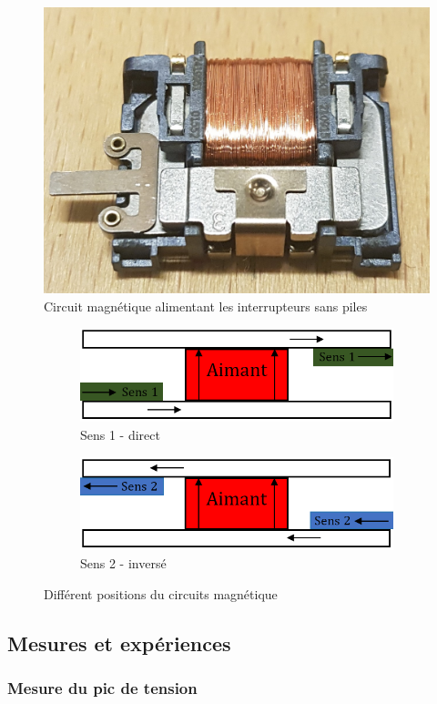 \documentclass{rapportENS}
\begin{document}
 \begin{figure}[h!]
 \includegraphics[width = .3\linewidth]{circuitmag.jpg}
 \centering
 \caption{Circuit magnétique alimentant les interrupteurs sans piles}
 \label{photocircuitmag}
 \end{figure}
 
 \begin{figure}[h!]
 \begin{subfigure}{.5\linewidth}
 \centering
 \includegraphics[width=.9\linewidth]{sens1.PNG}
 \caption{Sens 1 - direct}
 \label{sens1}
 \end{subfigure}
 \begin{subfigure}{.5\linewidth}
 \centering
 \includegraphics[width=.9\linewidth]{sens2.PNG}
 \caption{Sens 2 - inversé}
 \label{sens2}
 \end{subfigure}
 \caption{Différent positions du circuits magnétique}
 \label{schemacircuitmag}
 \end{figure}
 
 \subsection{Mesures et expériences}
 
 \subsubsection*{Mesure du pic de tension}
 
\end{document}
